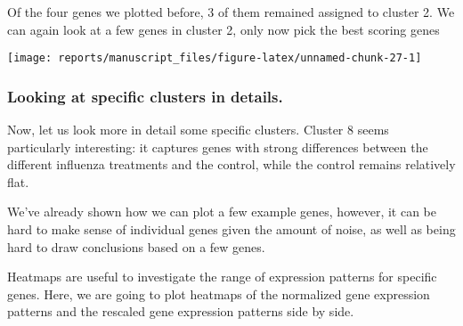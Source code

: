 \documentclass[9pt,a4paper,]{extarticle}
\newenvironment{Shaded}{\begin{snugshade}}{\end{snugshade}}
\newcommand{\CommentTok}[1]{\textcolor[rgb]{0.56,0.35,0.01}{\textit{#1}}}
\newcommand{\DataTypeTok}[1]{\textcolor[rgb]{0.13,0.29,0.53}{#1}}
\newcommand{\DecValTok}[1]{\textcolor[rgb]{0.00,0.00,0.81}{#1}}
\newcommand{\FloatTok}[1]{\textcolor[rgb]{0.00,0.00,0.81}{#1}}
\newcommand{\KeywordTok}[1]{\textcolor[rgb]{0.13,0.29,0.53}{\textbf{#1}}}
\newcommand{\NormalTok}[1]{#1}
\newcommand{\OperatorTok}[1]{\textcolor[rgb]{0.81,0.36,0.00}{\textbf{#1}}}
\newcommand{\OtherTok}[1]{\textcolor[rgb]{0.56,0.35,0.01}{#1}}
\newcommand{\StringTok}[1]{\textcolor[rgb]{0.31,0.60,0.02}{#1}}
\begin{document}
Of the four genes we plotted before, 3 of them remained assigned to cluster 2. We can again look at a
few genes in cluster 2, only now pick the best scoring genes

\begin{Shaded}
\end{Shaded}

\begin{center}\texttt{[image: reports/manuscript\_files/figure-latex/unnamed-chunk-27-1]} \end{center}

\hypertarget{looking-at-specific-clusters-in-details.}{%
\subsubsection{Looking at specific clusters in details.}\label{looking-at-specific-clusters-in-details.}}

Now, let us look more in detail some specific clusters. Cluster 8 seems
particularly interesting: it captures genes with strong differences between
the different influenza treatments and the control, while the control remains
relatively flat.

We've already shown how we can plot a few example genes, however, it can be
hard to make sense of individual genes given the amount of noise, as well as
being hard to draw conclusions based on a few genes.

Heatmaps are useful to investigate the range of expression patterns for
specific genes. Here, we are going to plot heatmaps of the normalized gene
expression patterns and the rescaled gene expression patterns side by side.
\end{document}
